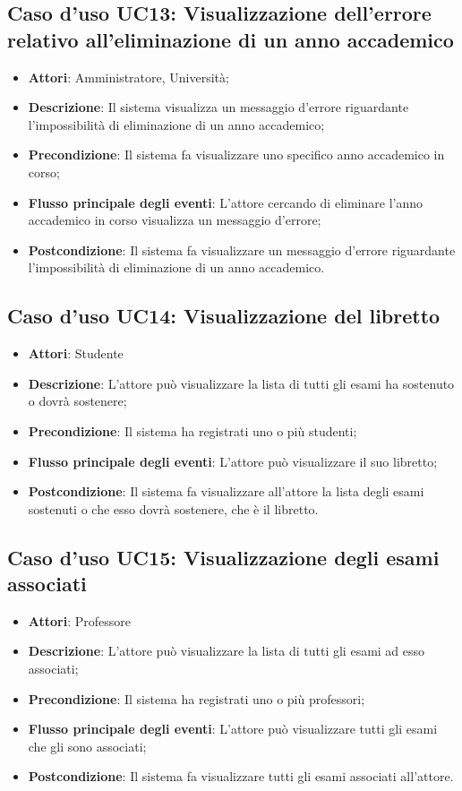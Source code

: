 \subsection{Caso d'uso \texorpdfstring{UC13}{UC13}: Visualizzazione dell'errore relativo all'eliminazione di un anno accademico}
\begin{itemize}
\item \textbf{Attori}: Amministratore, Università;
\item \textbf{Descrizione}: Il sistema visualizza un messaggio d'errore riguardante l'impossibilità di eliminazione di un anno accademico;
\item \textbf{Precondizione}: Il sistema fa visualizzare uno specifico anno accademico in corso;
\item \textbf{Flusso principale degli eventi}: L'attore cercando di eliminare l'anno accademico in corso visualizza un messaggio d'errore;
\item \textbf{Postcondizione}: Il sistema fa visualizzare un messaggio d'errore riguardante l'impossibilità di eliminazione di un anno accademico.

\end{itemize}
\subsection{Caso d'uso \texorpdfstring{UC14}{UC14}: Visualizzazione del libretto}
\begin{itemize}
\item \textbf{Attori}: Studente
\item \textbf{Descrizione}: L'attore può visualizzare la lista di tutti gli esami ha sostenuto o dovrà sostenere;
\item \textbf{Precondizione}: Il sistema ha registrati uno o più studenti;
\item \textbf{Flusso principale degli eventi}: L'attore può visualizzare il suo libretto;
\item \textbf{Postcondizione}: Il sistema fa visualizzare all'attore la lista degli esami sostenuti o che esso dovrà sostenere, che è il libretto.
\end{itemize}
\subsection{Caso d'uso \texorpdfstring{UC15}{UC15}: Visualizzazione degli esami associati}
\begin{itemize}
\item \textbf{Attori}: Professore
\item \textbf{Descrizione}: L'attore può visualizzare la lista di tutti gli esami ad esso associati;
\item \textbf{Precondizione}: Il sistema ha registrati uno o più professori;
\item \textbf{Flusso principale degli eventi}: L'attore può visualizzare tutti gli esami che gli sono associati;
\item \textbf{Postcondizione}: Il sistema fa visualizzare tutti gli esami associati all'attore.
\end{itemize}
